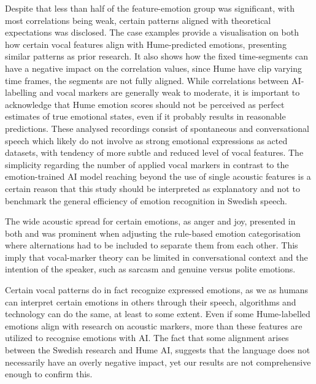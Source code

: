 Despite that less than half of the feature-emotion group was significant, with most correlations being weak, certain patterns aligned with theoretical expectations was disclosed. The case examples provide a visualisation on both how certain vocal features align with Hume-predicted emotions, presenting similar patterns as prior research. It also shows how the fixed time-segments can have a negative impact on the correlation values, since Hume have clip varying time frames, the segments are not fully aligned.  
While correlations between AI-labelling and vocal markers are generally weak to moderate, it is important to acknowledge that Hume emotion scores should not be perceived as perfect estimates of true emotional states, even if it probably results in reasonable predictions. 
These analysed recordings consist of spontaneous and conversational speech which likely do not involve as strong emotional expressions as acted datasets, with tendency of more subtle and reduced level of vocal features. The simplicity regarding the number of applied vocal markers in contrast to the emotion-trained AI model reaching beyond the use of single acoustic features is a certain reason that this study should be interpreted as explanatory and not to benchmark the general efficiency of emotion recognition in Swedish speech.    

The wide acoustic spread for certain emotions, as anger and joy, presented in both \autocites{Banse1996}{Ekberg2023} and was prominent when adjusting the rule-based emotion categorisation where alternations had to be included to separate them from each other. 
This imply that vocal-marker theory can be limited in conversational context and the intention of the speaker, such as sarcasm and genuine versus polite emotions. 

Certain vocal patterns do in fact recognize expressed emotions, as we as humans can interpret certain emotions in others through their speech, algorithms and technology can do the same, at least to some extent. 
Even if some Hume-labelled emotions align with research on acoustic markers, more than these features are utilized to recognise emotions with AI. The fact that some alignment arises between the Swedish research and Hume AI, 
suggests that the language does not necessarily have an overly negative impact, yet our results are not comprehensive enough to confirm this. 

